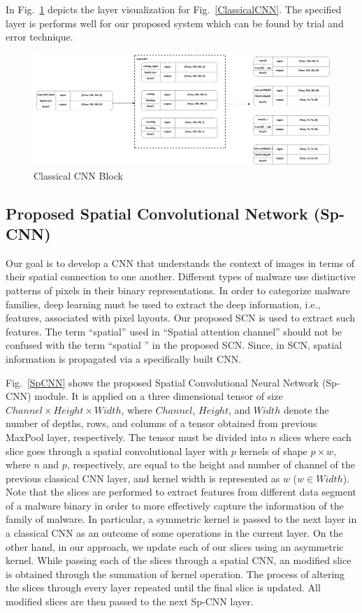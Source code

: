 \documentclass[pdflatex,sn-mathphys]{sn-jnl}%
\begin{document}
\color{blue}
In Fig.~\ref{ClassicalCNNlayer} depicts the layer visualization for Fig.~\ref{ClassicalCNN}. The specified layer is performs well for our proposed system which can be found by trial and error technique.

\begin{figure}[ht]
	\centering
	\includegraphics[width=1\textwidth]{CNN.drawio-2.png}
	\caption{Classical CNN Block}
	\label{ClassicalCNNlayer}
\end{figure}

\color{black}
\subsection{Proposed Spatial Convolutional Network (Sp-CNN)}
Our goal is to develop a CNN that understands the context of images in terms of their spatial connection to one another. Different types of malware use distinctive patterns of pixels in their binary representations. In order to categorize malware families, deep learning must be used to extract the deep information, i.e., features, associated with pixel layouts. Our proposed SCN is used to extract such features. The term ``spatial'' used in  ``Spatial attention channel'' should not be confused with the term ``spatial '' in the proposed SCN. Since, in SCN, spatial information is propagated via a specifically built CNN. 

Fig.~\ref{SpCNN} shows the proposed Spatial Convolutional Neural Network (Sp-CNN) module. It is applied on a three  dimensional tensor of size \({Channel}\times{Height}\times{Width}\), where $Channel$, $Height$, and $Width$ denote the number of depths, rows, and columns of a tensor obtained from previous MaxPool layer, respectively. The tensor must be divided into $n$ slices where each slice goes through a spatial convolutional layer with $p$ kernels of shape ${p} \times {w}$, where $n$ and $p$, respectively, are equal to the height and number of channel of the previous classical CNN layer, and kernel width is represented as $w$ ($w \in Width$). Note that the slices are performed to extract features from different data segment of a malware binary in order to more effectively capture the information of the family of malware. In particular, a symmetric kernel is passed to the next layer in a classical CNN as an outcome of some operations in the current layer. On the other hand, in our approach, we update each of our slices using an asymmetric kernel. While passing each of the slices through a spatial CNN, an modified slice is obtained through the summation of kernel operation. The process of altering the slices through every layer repeated until the final slice is updated. All modified slices are then passed to the next Sp-CNN layer.
\end{document}
